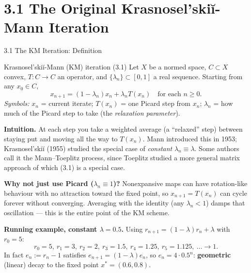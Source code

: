 \documentclass[aspectratio=169,10pt]{beamer}
\begin{document}
\section{3.1 The Original Krasnosel'ski\u{i}-Mann Iteration}

\begin{frame}[allowframebreaks]{3.1 The KM Iteration: Definition}

  \begin{block}{Krasnosel'ski\u{i}-Mann (KM) iteration (3.1)}
    Let $X$ be a normed space, $C\subset X$ convex, $T:C\to C$ an
    operator, and $\{\lambda_n\}\subset[0,1]$ a real sequence. Starting
    from any $x_0\in C$,
    $$x_{n+1}=(1-\lambda_n)x_n+\lambda_n T(x_n) \quad\text{for each } n\ge0.$$
    \emph{Symbols:} $x_n$ = current iterate; $T(x_n)$ = one Picard step
    from $x_n$; $\lambda_n$ = how much of the Picard step to take (the
    \emph{relaxation parameter}).
  \end{block}

  \textbf{Intuition.} At each step you take a weighted average
  (a ``relaxed'' step) between staying put and moving all the way to
  $T(x_n)$. Mann introduced this in 1953; Krasnosel'ski\u{i} (1955)
  studied the special case of \emph{constant} $\lambda_n\equiv\lambda$.
  Some authors call it the Mann--Toeplitz process, since Toeplitz
  studied a more general matrix approach of which (3.1) is a special
  case.

  \framebreak

  \textbf{Why not just use Picard ($\lambda_n\equiv1$)?} Nonexpansive
  maps can have rotation-like behaviour with no attraction toward the
  fixed point, so $x_{n+1}=T(x_n)$ can cycle forever without converging.
  Averaging with the identity (any $\lambda_n<1$) damps that
  oscillation --- this is the entire point of the KM scheme.

  \textbf{Running example, constant $\lambda=0.5$.} Using
  $r_{n+1}=(1-\lambda)r_n+\lambda$ with $r_0=5$:
  $$r_0=5,\ r_1=3,\ r_2=2,\ r_3=1.5,\ r_4=1.25,\ r_5=1.125,\ \dots \to 1.$$
  In fact $e_n:=r_n-1$ satisfies $e_{n+1}=(1-\lambda)e_n$, so
  $e_n=4\cdot0.5^n$: \textbf{geometric} (linear) decay to the fixed
  point $x^*=(0.6,0.8)$.
\end{frame}
\end{document}
